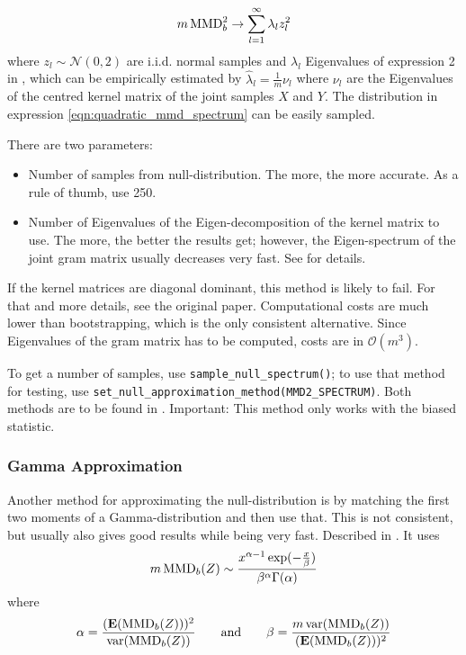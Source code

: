 \begin{align}
\label{eqn:quadratic_mmd_spectrum}
m\operatorname{MMD}^2_b \rightarrow \sum_{l=1}^\infty \lambda_l z_l^2
\end{align}
where $z_l\sim \mathcal{N}(0,2)$ are i.i.d. normal samples and $\lambda_l$ Eigenvalues of expression 2 in \citep{Gretton2012b}, which can be empirically estimated by $\hat\lambda_l=\frac{1}{m}\nu_l$ where $\nu_l$ are the Eigenvalues of the centred kernel matrix of the joint samples $X$ and $Y$. The distribution in expression \ref{eqn:quadratic_mmd_spectrum} can be easily sampled. 

There are two parameters:
\begin{itemize}
\item Number of samples from null-distribution. The more, the more accurate. As a rule of thumb, use 250.
\item Number of Eigenvalues of the Eigen-decomposition of the kernel matrix to use. The more, the better the results get; however, the Eigen-spectrum of the joint gram matrix usually decreases very fast. See \citep{Gretton2012b} for details.
\end{itemize}
If the kernel matrices are diagonal dominant, this method is likely to fail. For that and more details, see the original paper. Computational costs are much lower than bootstrapping, which is the only consistent alternative. Since Eigenvalues of the gram matrix has to be computed, costs are in $\mathcal{O}(m^3)$.

To get a number of samples, use \texttt{sample\_null\_spectrum()}; to use that method for testing, use \texttt{set\_null\_approximation\_method(MMD2\_SPECTRUM)}. Both methods are to be found in . Important: This method only works with the biased statistic.
\subsubsection{Gamma Approximation}
Another method for approximating the null-distribution is by matching the first two moments of a Gamma-distribution and then use that. This is not consistent, but usually also gives good results while being very fast. Described in \citep{Gretton2012b}. It uses
\begin{align}
\label{eqn:quadratic_mmd_gamma}
m\operatorname{MMD}_b(Z) \sim \frac{x^{\alpha-1}\exp(-\frac{x}{\beta})}{\beta^\alpha \Gamma(\alpha)}
\end{align}
where
\begin{align*}
\alpha=\frac{(\textbf{E}(\text{MMD}_b(Z)))^2}{\operatorname{var}(\text{MMD}_b(Z))} \qquad \text{and} \qquad
 \beta=\frac{m \operatorname{var}(\text{MMD}_b(Z))}{(\textbf{E}(\text{MMD}_b(Z)))^2}
\end{align*}

